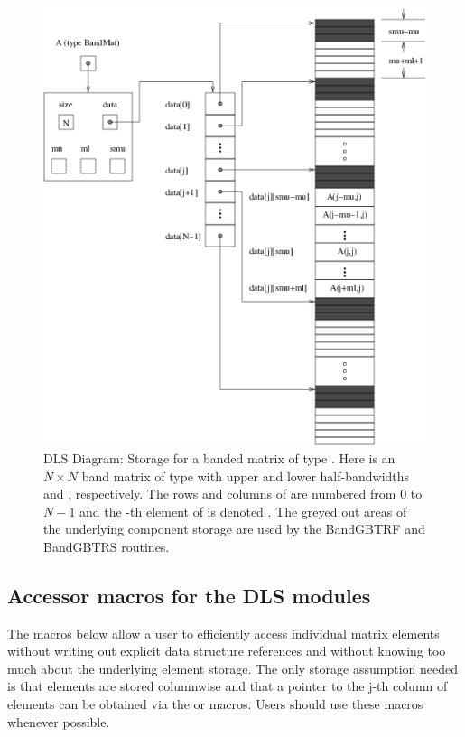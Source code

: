\documentclass[letterpaper,10pt,english]{sphinxmanual}
\begin{document}
\begin{figure}[htbp]
\centering
\capstart

\includegraphics{bandmat.png}
\caption{DLS Diagram: Storage for a banded matrix of type {\hyperref[linear_solvers/DLS:c.DlsMat]{\emph{}}}. Here
 is an \(N \times N\) band matrix of type {\hyperref[linear_solvers/DLS:c.DlsMat]{\emph{}}}
with upper and lower half-bandwidths  and ,
respectively. The rows and columns of  are numbered from
\(0\) to \(N-1\) and the -th element of  is
denoted . The greyed out areas of the underlying
component storage are used by the BandGBTRF and BandGBTRS routines.}\label{linear_solvers/DLS:dls-figure}\end{figure}


\subsection{Accessor macros for the DLS modules}
\label{linear_solvers/DLS:accessor-macros-for-the-dls-modules}
The macros below allow a user to efficiently access individual matrix
elements without writing out explicit data structure references and
without knowing too much about the underlying element storage.  The
only storage assumption needed is that elements are stored columnwise
and that a pointer to the j-th column of elements can be obtained via
the {\hyperref[linear_solvers/DLS:c.DENSE_COL]{\emph{}}} or {\hyperref[linear_solvers/DLS:c.BAND_COL]{\emph{}}} macros. Users should use these
macros whenever possible.
\end{document}
